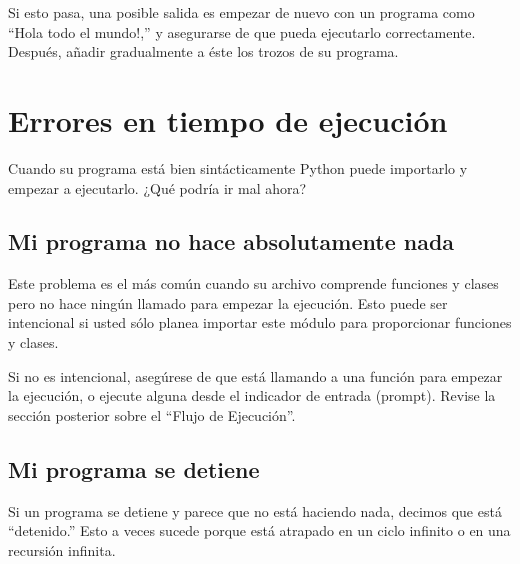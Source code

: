 Si esto pasa, una posible salida es empezar de nuevo con un 
programa como  ``Hola todo el mundo!,'' y asegurarse de que pueda
ejecutarlo correctamente. Después, añadir gradualmente a éste los
trozos de su programa.



\section{Errores en tiempo de ejecución}

Cuando su programa está bien sintácticamente Python puede importarlo
y empezar a ejecutarlo. ¿Qué podría ir mal ahora?


\subsection{Mi programa no hace absolutamente nada}

Este problema es el más común cuando su archivo comprende funciones y 
clases pero no hace ningún llamado para empezar la ejecución. Esto 
puede ser intencional si usted sólo planea importar este módulo
para proporcionar funciones y clases.

Si no es intencional, asegúrese de que está llamando a una función 
para empezar la ejecución, o ejecute alguna desde el indicador de entrada (prompt).
Revise la sección posterior sobre el ``Flujo de Ejecución''.



\subsection{Mi programa se detiene}

Si un programa se detiene y parece que no está haciendo nada,
decimos que está ``detenido.''  Esto a veces sucede porque 
está atrapado en un ciclo infinito o en una recursión infinita.

